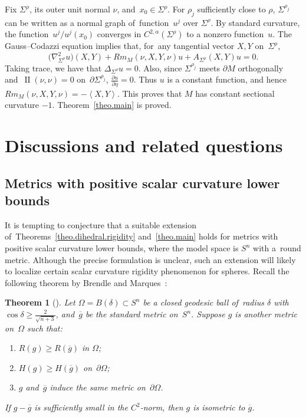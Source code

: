 \documentclass[pdftex]{sigma}
\numberwithin{equation}{section}
\newtheorem{theo}[prop]{Theorem}
\theoremstyle{definition}
\DeclareMathOperator{\secondfund}{II}
\newcommand{\pa}[2]{\frac{\partial #1}{\partial #2}}
\newcommand{\bangle}[1]{\left\langle #1 \right\rangle}
\begin{document}
Fix $\Sigma^\rho$, its outer unit normal $\nu$, and~$x_0\in \Sigma^\rho$. For $\rho_j$ sufficiently close to $\rho$, $\Sigma^{\rho_j}$ can be writ\-ten as a normal graph of~function~$u^j$ over $\Sigma^\rho$. By standard curvature, the function~$u^j/u^j(x_0)$ converges in $C^{2,\alpha}(\Sigma^\rho)$ to a nonzero function~$u$. The Gauss--Codazzi equation implies that, for~any tangential vector $X,Y$ on~$\Sigma^\rho$,
\[
\big(\nabla_{\Sigma^\rho}^2 u\big)(X,Y)+Rm_M(\nu,X,Y,\nu)u + A_{\Sigma^\rho}(X,Y)u=0.
\]
Taking trace, we have that $\Delta_{\Sigma^\rho}u=0$. Also, since $\Sigma^{\rho_j}$ meets $\partial M$ orthogonally and~$\secondfund(\nu,\nu)=0$ on~$\partial\Sigma^{\rho_j}$, $\pa{u}{\eta}=0$. Thus $u$ is a constant function, and hence $Rm_M(\nu,X,Y,\nu)=-\bangle{X,Y}$. This proves that $M$ has constant sectional curvature $-1$. Theorem~\ref{theo.main} is proved.

\section{Discussions and related questions}\label{section4}
\subsection{Metrics with positive scalar curvature lower bounds}
It is tempting to conjecture that a suitable extension of~Theorems~\ref{theo.dihedral.rigidity} and~\ref{theo.main} holds for metrics with positive scalar curvature lower bounds, where the model space is $S^n$ with a~round metric. Although the precise formulation is unclear, such an extension will likely to localize certain scalar curvature rigidity phenomenon for spheres. Recall the following theorem by Brendle and Marques~\cite{BrendleMarques2011scalar}:

\begin{theo}[\cite{BrendleMarques2011scalar}]
Let $\Omega=B(\delta)\subset S^n$ be a closed geodesic ball of~radius $\delta$ with $\cos\delta\ge \frac{2}{\sqrt{n+3}}$, and~$\overline{g}$ be the standard metric on~$S^n$. Suppose $g$ is another metric on~$\Omega$ such that:
\begin{enumerate}\itemsep=0pt
\item[${\rm 1)}$] $R(g)\ge R(\overline{g})$ in $\Omega$;
\item[${\rm 2)}$] $H(g)\ge H(\overline{g})$ on~$\partial \Omega$;
\item[${\rm 3)}$] $g$ and~$\overline{g}$ induce the same metric on~$\partial \Omega$.
\end{enumerate}
If $g-\overline{g}$ is sufficiently small in the $C^2$-norm, then $g$ is isometric to $\overline{g}$.
\end{theo}
\end{document}

